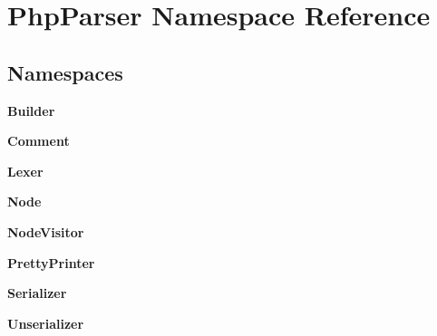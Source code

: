 \section{Php\+Parser Namespace Reference}
\label{namespace_php_parser}
\subsection*{Namespaces}
\begin{DoxyCompactItemize}
\item 
 {\bf Builder}
\item 
 {\bf Comment}
\item 
 {\bf Lexer}
\item 
 {\bf Node}
\item 
 {\bf Node\+Visitor}
\item 
 {\bf Pretty\+Printer}
\item 
 {\bf Serializer}
\item 
 {\bf Unserializer}
\end{DoxyCompactItemize}
